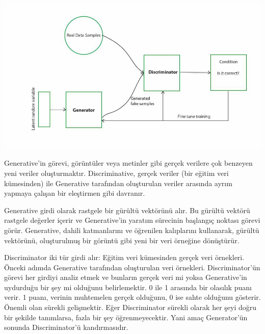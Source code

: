 \documentclass[12pt, a4paper]{article}
\begin{document}
		\includegraphics[width=1\textwidth]{gan}

		Generative'in görevi, görüntüler veya metinler gibi gerçek verilere çok benzeyen yeni veriler oluşturmaktır. Discriminative, gerçek veriler (bir eğitim veri kümesinden) ile Generative tarafından oluşturulan veriler arasında ayrım yapmaya çalışan bir eleştirmen gibi davranır.
		
		Generative girdi olarak rastgele bir gürültü vektörünü alır. Bu gürültü vektörü rastgele değerler içerir ve Generative'in yaratım sürecinin başlangıç noktası görevi görür. Generative, dahili katmanlarını ve öğrenilen kalıplarını kullanarak, gürültü vektörünü, oluşturulmuş bir görüntü gibi yeni bir veri örneğine dönüştürür.

		Discriminator iki tür girdi alır:
		Eğitim veri kümesinden gerçek veri örnekleri.
		Önceki adımda Generative tarafından oluşturulan veri örnekleri. Discriminator'ün görevi her girdiyi analiz etmek ve bunların gerçek veri mi yoksa Generative'in uydurduğu bir şey mi olduğunu belirlemektir. 0 ile 1 arasında bir olasılık puanı verir. 1 puanı, verinin muhtemelen gerçek olduğunu, 0 ise sahte olduğunu gösterir.
		Önemli olan sürekli gelişmektir. Eğer Discriminator sürekli olarak her şeyi doğru bir şekilde tanımlarsa, fazla bir şey öğrenmeyecektir. Yani amaç Generator'ün sonunda Discriminator'ü kandırmasıdır.
		
\end{document}
